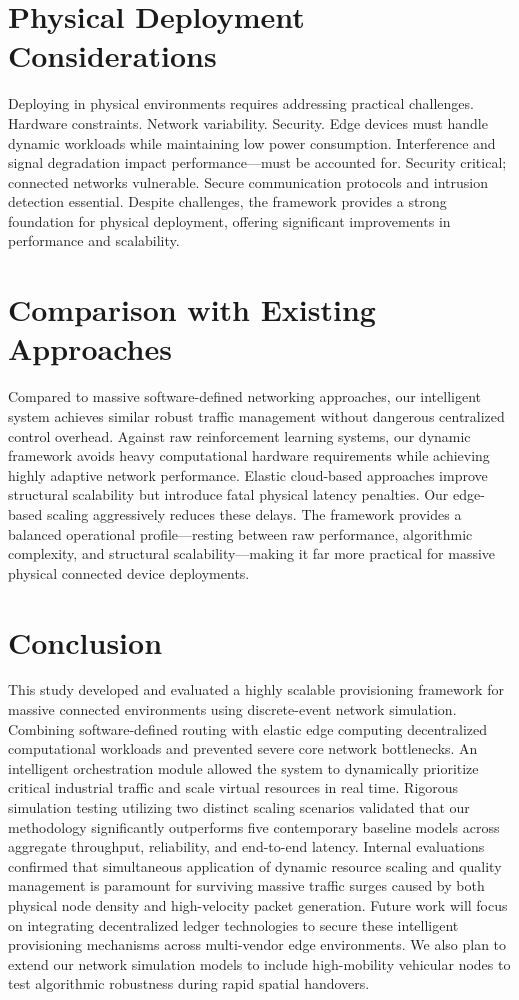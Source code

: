 \documentclass[a4paper,fleqn]{cas-dc}
\numberwithin{equation}{section}
\begin{document}
\section{Physical Deployment Considerations}

Deploying in physical environments requires addressing practical challenges. Hardware constraints. Network variability. Security. Edge devices must handle dynamic workloads while maintaining low power consumption. Interference and signal degradation impact performance—must be accounted for. Security critical; connected networks vulnerable. Secure communication protocols and intrusion detection essential. Despite challenges, the framework provides a strong foundation for physical deployment, offering significant improvements in performance and scalability.

\section{Comparison with Existing Approaches}

Compared to massive software-defined networking approaches, our intelligent system achieves similar robust traffic management without dangerous centralized control overhead. Against raw reinforcement learning systems, our dynamic framework avoids heavy computational hardware requirements while achieving highly adaptive network performance. Elastic cloud-based approaches improve structural scalability but introduce fatal physical latency penalties. Our edge-based scaling aggressively reduces these delays. The framework provides a balanced operational profile—resting between raw performance, algorithmic complexity, and structural scalability—making it far more practical for massive physical connected device deployments.

\section{Conclusion}

This study developed and evaluated a highly scalable provisioning framework for massive connected environments using discrete-event network simulation. Combining software-defined routing with elastic edge computing decentralized computational workloads and prevented severe core network bottlenecks. An intelligent orchestration module allowed the system to dynamically prioritize critical industrial traffic and scale virtual resources in real time. Rigorous simulation testing utilizing two distinct scaling scenarios validated that our methodology significantly outperforms five contemporary baseline models across aggregate throughput, reliability, and end-to-end latency. Internal evaluations confirmed that simultaneous application of dynamic resource scaling and quality management is paramount for surviving massive traffic surges caused by both physical node density and high-velocity packet generation. Future work will focus on integrating decentralized ledger technologies to secure these intelligent provisioning mechanisms across multi-vendor edge environments. We also plan to extend our network simulation models to include high-mobility vehicular nodes to test algorithmic robustness during rapid spatial handovers.
\end{document}

